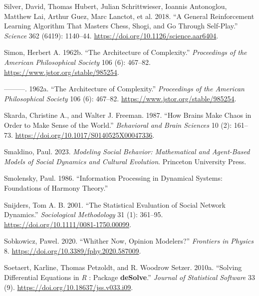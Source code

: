 \documentclass[
  a4paper,
  DIV=11,
  numbers=noendperiod,
  oneside]{scrreprt}
\newlength{\cslhangindent}
\newlength{\cslentryspacingunit} %
\newenvironment{CSLReferences}[2] %
 {%
  \setlength{\parindent}{0pt}
  \ifodd #1
  \let\oldpar\par
  \def\par{\hangindent=\cslhangindent\oldpar}
  \fi
  \setlength{\parskip}{#2\cslentryspacingunit}
 }%
 {}
\begin{document}
\begin{CSLReferences}{1}{0}
\leavevmode{}%
Silver, David, Thomas Hubert, Julian Schrittwieser, Ioannis Antonoglou,
Matthew Lai, Arthur Guez, Marc Lanctot, et al. 2018. {``A General
Reinforcement Learning Algorithm That Masters Chess, Shogi, and {Go}
Through Self-Play.''} \emph{Science} 362 (6419): 1140--44.
\url{https://doi.org/10.1126/science.aar6404}.

\leavevmode{}%
Simon, Herbert A. 1962b. {``The {Architecture} of {Complexity}.''}
\emph{Proceedings of the American Philosophical Society} 106 (6):
467--82. \url{https://www.jstor.org/stable/985254}.

\leavevmode{}%
---------. 1962a. {``The Architecture of Complexity.''}
\emph{Proceedings of the American Philosophical Society} 106 (6):
467--82. \url{https://www.jstor.org/stable/985254}.

\leavevmode{}%
Skarda, Christine A., and Walter J. Freeman. 1987. {``How Brains Make
Chaos in Order to Make Sense of the World.''} \emph{Behavioral and Brain
Sciences} 10 (2): 161--73.
\url{https://doi.org/10.1017/S0140525X00047336}.

\leavevmode{}%
Smaldino, Paul. 2023. \emph{Modeling Social Behavior: Mathematical and
Agent-Based Models of Social Dynamics and Cultural Evolution}. Princeton
University Press.

\leavevmode{}%
Smolensky, Paul. 1986. {``Information {Processing} in {Dynamical
Systems}: {Foundations} of {Harmony Theory}.''}

\leavevmode{}%
Snijders, Tom A. B. 2001. {``The {Statistical Evaluation} of {Social
Network Dynamics}.''} \emph{Sociological Methodology} 31 (1): 361--95.
\url{https://doi.org/10.1111/0081-1750.00099}.

\leavevmode{}%
Sobkowicz, Pawel. 2020. {``Whither {Now}, {Opinion Modelers}?''}
\emph{Frontiers in Physics} 8.
\url{https://doi.org/10.3389/fphy.2020.587009}.

\leavevmode{}%
Soetaert, Karline, Thomas Petzoldt, and R. Woodrow Setzer. 2010a.
{``Solving {Differential Equations} in {\emph{R}} : {Package}
{\textbf{deSolve}}.''} \emph{Journal of Statistical Software} 33 (9).
\url{https://doi.org/10.18637/jss.v033.i09}.


\end{CSLReferences}
\end{document}
